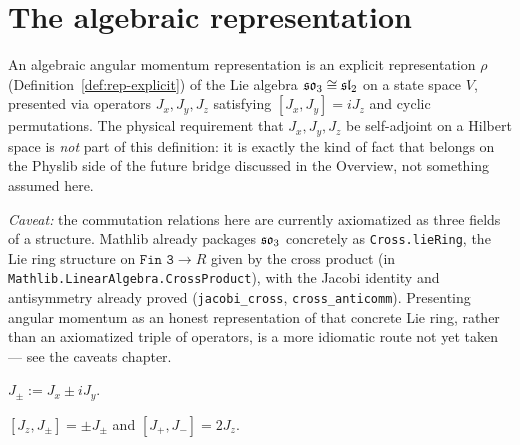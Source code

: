 \section{The algebraic representation}
\label{sec:am-basic}

\begin{definition}
  \label{def:am-representation}
  \leanok
  An algebraic angular momentum representation is an explicit representation
  $\rho$ (Definition~\ref{def:rep-explicit}) of the Lie algebra $\mathfrak{so}_3
  \cong \mathfrak{sl}_2$ on a state space $V$, presented via operators $J_x, J_y, J_z$
  satisfying $[J_x,J_y] = iJ_z$ and cyclic permutations. The physical
  requirement that $J_x,J_y,J_z$ be self-adjoint on a Hilbert space is
  \emph{not} part of this definition: it is exactly the kind of fact that
  belongs on the Physlib side of the future bridge discussed in the Overview,
  not something assumed here.

  \emph{Caveat:} the commutation relations here are currently axiomatized as
  three fields of a structure. Mathlib already packages $\mathfrak{so}_3$
  concretely as \texttt{Cross.lieRing}, the Lie ring structure on
  $\texttt{Fin 3} \to R$ given by the cross product (in
  \texttt{Mathlib.LinearAlgebra.CrossProduct}), with the Jacobi identity and
  antisymmetry already proved (\texttt{jacobi\_cross}, \texttt{cross\_anticomm}).
  Presenting angular momentum as an honest representation of that concrete
  Lie ring, rather than an axiomatized triple of operators, is a more
  idiomatic route not yet taken --- see the caveats chapter.
\end{definition}

\begin{definition}
  \label{def:am-ladder}
  \leanok
  $J_\pm := J_x \pm i J_y$.
\end{definition}

\begin{theorem}
  \label{thm:am-commutators}
  \leanok
  $[J_z, J_\pm] = \pm J_\pm$ and $[J_+, J_-] = 2J_z$.
\end{theorem}

